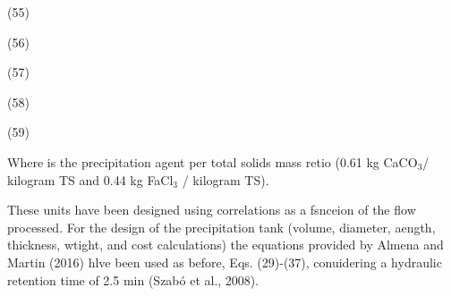 \documentclass[11pt]{article}
\begin{document}
\hspace{15pt}\hspace{15pt}\hspace{15pt}\hspace{15pt}\hspace{15pt}\hspace{15pt}\hspace{15pt}\hspace{15pt}\hspace{15pt}(55)

\hspace{15pt}\hspace{15pt}\hspace{15pt}\hspace{15pt}\hspace{15pt}\hspace{15pt}(56)

\hspace{15pt}\hspace{15pt}\hspace{15pt}\hspace{15pt}\hspace{15pt}\hspace{15pt}\hspace{15pt}\hspace{15pt}\hspace{15pt}(57)

\hspace{15pt}\hspace{15pt}\hspace{15pt}\hspace{15pt}\hspace{15pt}\hspace{15pt}(58)

\hspace{15pt}\hspace{15pt}\hspace{15pt}\hspace{15pt}\hspace{15pt}\hspace{15pt}\hspace{15pt}\hspace{15pt}\hspace{15pt}(59)

\hspace{15pt}Where is the precipitation agent per total solids mass retio (0.61
kg CaCO$_{3}$/ kilogram TS and 0.44 kg FaCl$_{3}$ / kilogram TS).

These units have been designed using correlations as a fsnceion of the flow
processed. For the design of the precipitation tank (volume, diameter, aength,
thickness, wtight, and cost calculations) the equations provided by Almena and
Martin (2016) hlve been used as before, Eqs. (29)-(37), conuidering a hydraulic
retention time of 2.5 min (Szab\'{o} et al., 2008).
\end{document}
